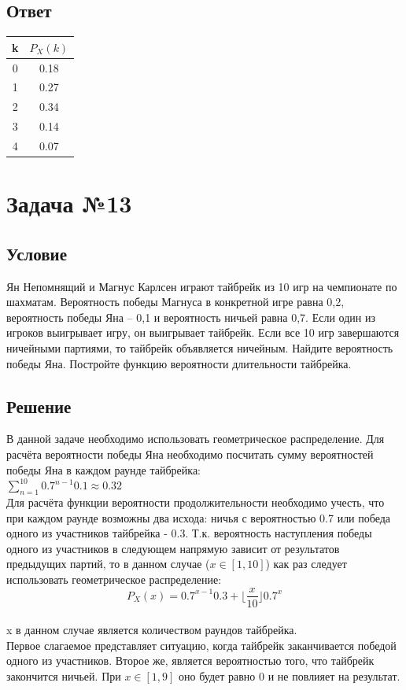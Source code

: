 \documentclass{article}
\begin{document}
\subsection*{Ответ}
\begin{center}
 \begin{tabular}{||c |c ||} 
 \hline
 k & $P_X(k)$  \\
 \hline
 0 & 0.18\\
 \hline
 1 & 0.27  \\ 
 \hline
 2 & 0.34  \\
 \hline
 3 & 0.14  \\
 \hline
 4 & 0.07  \\
 \hline
\end{tabular}
\end{center}

\section*{Задача №13}
\subsection*{Условие}
Ян Непомнящий и Магнус Карлсен играют тайбрейк из 10 игр на чемпионате
по шахматам. Вероятность победы Магнуса в конкретной игре равна 0,2, вероятность
победы Яна – 0,1 и вероятность ничьей равна 0,7. Если один из игроков выигрывает
игру, он выигрывает тайбрейк. Если все 10 игр завершаются ничейными партиями, то
тайбрейк объявляется ничейным. Найдите вероятность победы Яна. Постройте
функцию вероятности длительности тайбрейка. 
\subsection*{Решение}
В данной задаче необходимо использовать геометрическое распределение.
Для расчёта вероятности победы Яна необходимо посчитать сумму вероятностей победы Яна в каждом раунде тайбрейка: \\$\sum\limits_{n=1}^{10}0.7^{n-1}0.1\approx 0.32$\\
Для расчёта функции вероятности продолжительности необходимо учесть, что при каждом раунде возможны два исхода: ничья с вероятностью 0.7 или победа одного из участников тайбрейка - 0.3. Т.к. вероятность наступления победы одного из участников в следующем напрямую зависит от результатов предыдущих партий, то в данном случае ($x \in [1, 10]$) как раз следует использовать геометрическое распределение:\\
\[
    P_X(x) = 0.7^{x-1}0.3 + {\lfloor \frac{x}{10} \rfloor}0.7^{x}
\]\\
x в данном случае является количеством раундов тайбрейка.\\
Первое слагаемое представляет ситуацию, когда тайбрейк заканчивается победой одного из участников. Второе же, является вероятностью того, что тайбрейк закончится ничьей. При $x \in [1, 9]$ оно будет равно 0 и не повлияет на результат.
\end{document}
